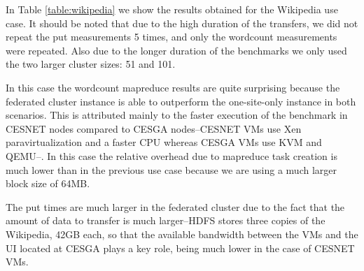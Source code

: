 \documentclass[oribibl]{llncs_Ibergrid2013}
\begin{document}
In Table \ref{table:wikipedia} we show the results obtained for the Wikipedia use case. It should be noted that due to the high duration of the transfers, we did not repeat the put measurements 5 times, and only the wordcount measurements were repeated. Also due to the longer duration of the benchmarks we only used the two larger cluster sizes: 51 and 101.

In this case the wordcount mapreduce results are quite surprising because the federated cluster instance is able to outperform the one-site-only instance in both scenarios. This is attributed mainly to the faster execution of the benchmark in CESNET nodes compared to CESGA nodes--CESNET VMs use Xen paravirtualization and a faster CPU whereas CESGA VMs use KVM and QEMU--. In this case the relative overhead due to mapreduce task creation is much lower than in the previous use case because we are using a much larger block size of 64MB.

The put times are much larger in the federated cluster due to the fact that the amount of data to transfer is much larger--HDFS stores three copies of the Wikipedia, 42GB each, so that the available bandwidth between the VMs and the UI located at CESGA plays a key role, being much lower in the case of CESNET VMs.
\end{document}

